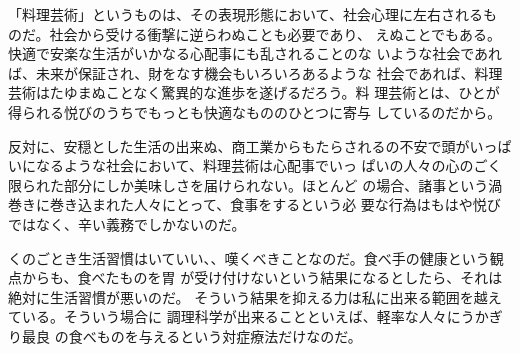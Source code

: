 「料理芸術」というものは、その表現形態において、社会心理に左右されるも
のだ。社会から受ける衝撃に逆らわぬことも必要であり、
えぬことでもある。快適で安楽な生活がいかなる心配事にも乱されることのな
いような社会であれば、未来が保証され、財をなす機会もいろいろあるような
社会であれば、料理芸術はたゆまぬことなく驚異的な進歩を遂げるだろう。料
理芸術とは、ひとが得られる悦びのうちでもっとも快適なもののひとつに寄与
しているのだから。

反対に、安穏とした生活の出来ぬ、商工業からもたらされるの不安で頭がいっぱいになるような社会において、料理芸術は心配事でいっ
ぱいの人々の心のごく限られた部分にしか美味しさを届けられない。ほとんど
の場合、諸事という渦巻きに巻き込まれた人々にとって、食事をするという必
要な行為はもはや悦びではなく、辛い義務でしかないのだ。

くのごとき生活習慣はいていい、、嘆くべきことなのだ。食べ手の健康という観点からも、食べたものを胃
が受け付けないという結果になるとしたら、それは絶対に生活習慣が悪いのだ。
そういう結果を抑える力は私に出来る範囲を越えている。そういう場合に
調理科学が出来ることといえば、軽率な人々にうかぎり最良
の食べものを与えるという対症療法だけなのだ。

